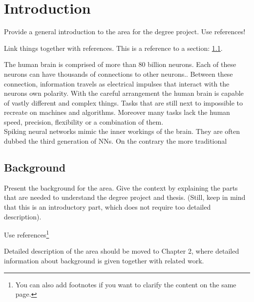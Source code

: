 \chapter{Introduction}

Provide a general introduction to the area for the degree project. Use references!

Link things together with references. This is a reference to a section: \ref{sec:background}.



The human brain is comprised of more than 80 billion neurons. Each of these neurons can have thousands of connections to other neurons.. Between these connection, information travels as electrical impulses that interact with the neurons own polarity. With the careful arrangement the human brain is capable of vastly different and complex things. Tasks that are still next to impossible to recreate on machines and algorithms. Moreover many tasks lack the human speed, precision, flexibility or a combination of them.\\



Spiking neural networks mimic the inner workings of the brain. They are often dubbed the third generation of \acp{NN}. On the contrary the more traditional




\section{Background}
\label{sec:background}
Present the background for the area. Give the context by explaining the parts that are needed to understand the degree project and thesis. (Still, keep in mind that this is an introductory part, which does not require too detailed description).

Use references\footnote{You can also add footnotes if you want to clarify the content on the same page.}

Detailed description of the area should be moved to Chapter 2, where detailed information about background is given together with related work.



